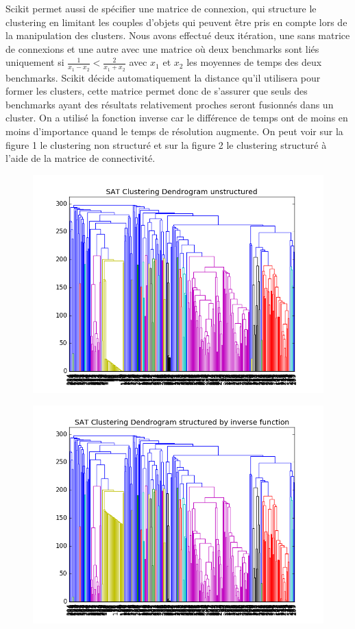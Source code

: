 \documentclass[a4paper,11pt]{article}
\begin{document}
Scikit permet aussi de spécifier une matrice de connexion, qui structure le clustering en limitant les couples d'objets qui peuvent être pris en compte lors de la manipulation des clusters. Nous avons effectué deux itération, une 
sans matrice de connexions et une autre avec une matrice où deux benchmarks sont liés uniquement si $ \frac{1}{x_1 - x_2} < \frac{2}{x_1 + x_2}$ avec $x_1$ et $x_2$ les moyennes de temps des deux benchmarks. 
Scikit décide automatiquement la distance qu'il utilisera pour former les clusters, cette matrice permet donc de s'assurer que seuls des benchmarks ayant des résultats relativement proches seront fusionnés dans 
un cluster. On a utilisé la fonction inverse car le différence de temps ont de moins en moins d'importance quand le temps de résolution augmente. On peut voir sur la figure 1 le clustering non structuré et sur 
la figure 2 le clustering structuré à l'aide de la matrice de connectivité.

\begin{figure}
  \centering
  \caption{}
  \includegraphics[scale=0.50]{../Pictures/SAT_Clustering_Dendrogram_unstructured.png}
\end{figure}

\begin{figure}
  \centering
  \caption{}
  \includegraphics[scale=0.50]{../Pictures/SAT_Clustering_Dendrogram_structured_by_inverse_function.png}
\end{figure}
\end{document}
